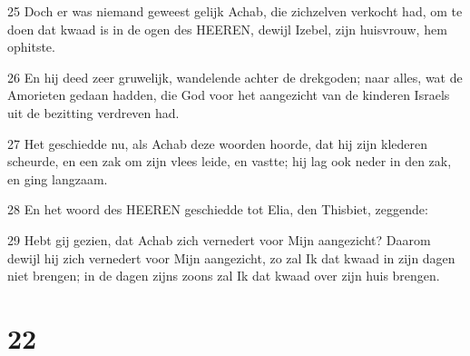 \par 25 Doch er was niemand geweest gelijk Achab, die zichzelven verkocht had, om te doen dat kwaad is in de ogen des HEEREN, dewijl Izebel, zijn huisvrouw, hem ophitste.
\par 26 En hij deed zeer gruwelijk, wandelende achter de drekgoden; naar alles, wat de Amorieten gedaan hadden, die God voor het aangezicht van de kinderen Israels uit de bezitting verdreven had.
\par 27 Het geschiedde nu, als Achab deze woorden hoorde, dat hij zijn klederen scheurde, en een zak om zijn vlees leide, en vastte; hij lag ook neder in den zak, en ging langzaam.
\par 28 En het woord des HEEREN geschiedde tot Elia, den Thisbiet, zeggende:
\par 29 Hebt gij gezien, dat Achab zich vernedert voor Mijn aangezicht? Daarom dewijl hij zich vernedert voor Mijn aangezicht, zo zal Ik dat kwaad in zijn dagen niet brengen; in de dagen zijns zoons zal Ik dat kwaad over zijn huis brengen.

\chapter{22}

